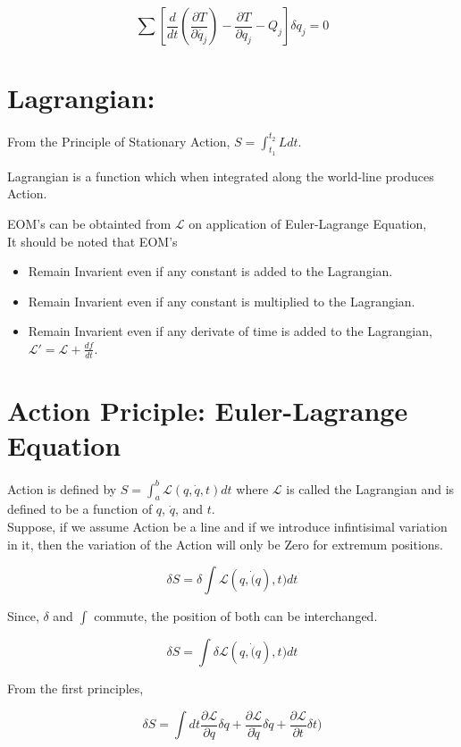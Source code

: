 \documentclass[a4paper]{article}
\newcommand{\Lagr}{\mathcal{L}}
\newcommand{\ddt}{\frac{d}{dt}}
\newcommand{\ddtf}[1]{\frac{d #1}{dt}}
\newcommand{\pdt}[2]{\frac{\partial #1}{\partial #2}}
\begin{document}
			\begin{equation}
				\sum[\ddt(\pdt{T}{\dot{q_j}}) - \pdt{T}{q_j} - Q_j]\delta q_j = 0 
			\end{equation}
		
	\section*{Lagrangian: }
		From the Principle of Stationary Action, $S = \int_{t_1}^{t_2} L dt $.

		Lagrangian is a function which when integrated along the world-line produces Action.

		EOM's can be obtainted from $\Lagr$ on application of Euler-Lagrange Equation, \hfill \\
		
		It should be noted that EOM's
		\begin{itemize}
			\item Remain Invarient even if any constant is added to the Lagrangian.
			\item Remain Invarient even if any constant is multiplied to the Lagrangian.
			\item Remain Invarient even if any derivate of time is added to the Lagrangian, $\Lagr' = \Lagr + \ddtf{f}$. 
	
		\end{itemize}

	\section*{Action Priciple: Euler-Lagrange Equation }
		
		Action is defined by $S = \int_a^b \Lagr(q, \dot{q}, t) dt$ where $\Lagr$ is called the Lagrangian and is defined to be a function of $q$, $\dot{q}$, and $t$. \hfill \\

		Suppose, if we assume Action be a line and if we introduce infintisimal variation in it, then the variation of the Action will only be Zero for extremum positions.

		$$ \delta S = \delta \int \Lagr(q, \dot(q), t) dt $$

		Since, $\delta$ and $\int$ commute, the position of both can be interchanged.

		$$ \delta S = \int \delta \Lagr(q, \dot(q), t) dt $$

		From the first principles,

		$$ \delta S = \int dt \frac{\partial\Lagr}{\partial q}\delta q + \frac{\partial\Lagr}{\partial\dot{q}}\delta \dot{q} + \frac{\partial\Lagr}{\partial t}\delta t) $$
\end{document}
